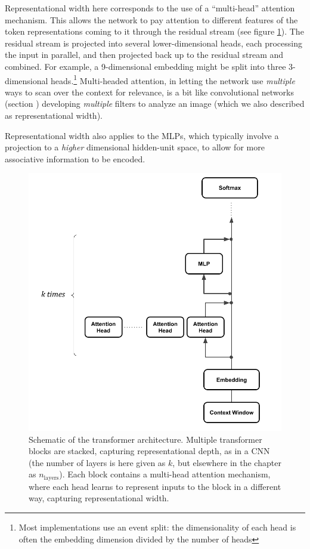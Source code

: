 Representational width here corresponds to the use of a
``multi-head'' attention mechanism. This allows the network to pay attention to
different features of the token representations coming to it through the
residual stream (see figure \ref{multipleHeads}). The residual stream is projected into several lower-dimensional heads, each processing the input in parallel, and then projected back up to the residual stream and combined. For example, a 9-dimensional embedding might be split into three 3-dimensional heads.\footnote{Most implementations use an event split: the dimensionality of each head is often the embedding dimension divided by the number of heads}
Multi-headed attention, in letting the
network use \emph{multiple} ways to scan over the context for relevance, is a
bit like convolutional networks (section )
developing \emph{multiple} filters to analyze an image (which we also described as
representational width). 

Representational width also applies to the MLPs, which typically involve a projection to a \emph{higher} dimensional hidden-unit space, to allow for more associative information to be encoded.

\begin{figure}[ht]
\centering
\includegraphics[scale=.35]{./images/transformerBlockMultiHeadResidualStream.png}
\caption[Jeff Yoshimi with consultation from Tim Meyer.]{Schematic of the
transformer architecture. Multiple transformer blocks are stacked, capturing
representational depth, as in a CNN (the number of layers is here given as $k$, but elsewhere in the chapter as $n_{\mbox{layers}}$). Each block contains a multi-head attention
mechanism, where each head learns to represent inputs to the block in a
different way, capturing representational width.}
\label{multipleHeads}
\end{figure}
 
